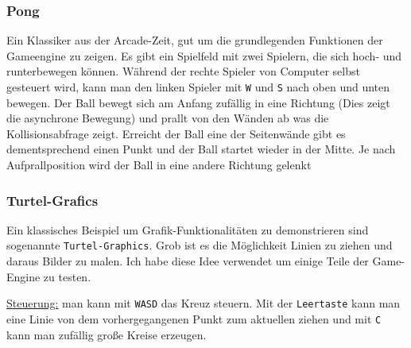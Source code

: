     \subsubsection{Pong}
        Ein Klassiker aus der Arcade-Zeit, gut um die grundlegenden Funktionen der Gameengine zu zeigen.
        Es gibt ein Spielfeld mit zwei Spielern, die sich hoch- und runterbewegen können. Während der rechte Spieler von Computer selbst gesteuert wird, kann man den linken Spieler mit \verb|W| und \verb|S| nach oben und unten bewegen. 
        Der Ball bewegt sich am Anfang zufällig in eine Richtung (Dies zeigt die asynchrone Bewegung) und prallt von den Wänden ab was die Kollisionsabfrage zeigt. Erreicht der Ball eine der Seitenwände gibt es dementsprechend einen Punkt und der Ball startet wieder in der Mitte. Je nach Aufprallposition wird der Ball in eine andere Richtung gelenkt


    \subsubsection{Turtel-Grafics}
        Ein klassisches Beispiel um Grafik-Funktionalitäten zu demonstrieren sind sogenannte \verb|Turtel-Graphics|. Grob ist es die Möglichkeit Linien zu ziehen und daraus Bilder zu malen.
        Ich habe diese Idee verwendet um einige Teile der Game-Engine zu testen.

        \underline{Steuerung:} man kann mit \verb|WASD| das Kreuz steuern. Mit der \verb|Leertaste| kann man eine Linie von dem vorhergegangenen Punkt zum aktuellen ziehen und mit \verb|C| kann man zufällig große Kreise erzeugen.